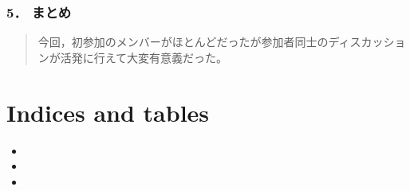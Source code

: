 \documentclass[letterpaper,10pt,dvipdfmx]{sphinxmanual}
\begin{document}
\subsection{5． まとめ}
\label{minute-05-20160824:id11}\begin{quote}

今回，初参加のメンバーがほとんどだったが参加者同士のディスカッションが活発に行えて大変有意義だった。
\end{quote}


\chapter{Indices and tables}
\label{index:indices-and-tables}\begin{itemize}
\item {} 

\item {} 

\item {} 

\end{itemize}



\renewcommand{\indexname}{索引}
\printindex
\end{document}
